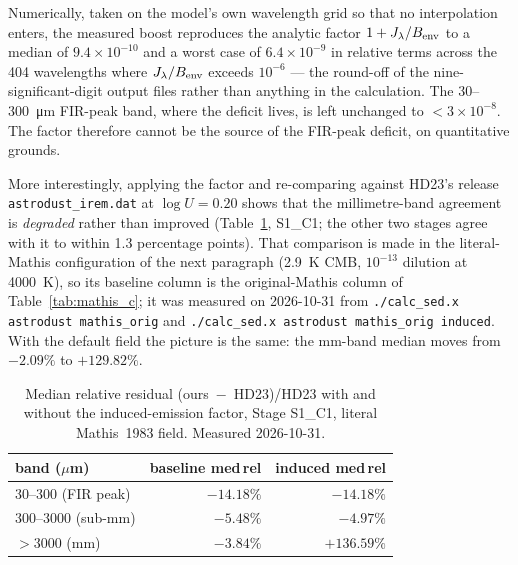 \documentclass{my_memo}
\begin{document}
Numerically, taken on the model's own wavelength grid so that no
interpolation enters, the measured boost reproduces the analytic factor
$1 + J_\lambda/B_{\rm env}$ to a median of $9.4\times10^{-10}$ and a
worst case of $6.4\times10^{-9}$ in relative terms across the 404
wavelengths where $J_\lambda/B_{\rm env}$ exceeds $10^{-6}$ --- the
round-off of the nine-significant-digit output files rather than
anything in the calculation. The \SI{30}{}--\SI{300}{\micro\meter}
FIR-peak band, where the deficit lives, is left unchanged to
$<3\times10^{-8}$. The factor therefore cannot be the source of the
FIR-peak deficit, on quantitative grounds.

More interestingly, applying the factor and re-comparing against
HD23's release \texttt{astrodust\_irem.dat} at $\log U = 0.20$
shows that the millimetre-band agreement is \emph{degraded} rather
than improved (Table~\ref{tab:induced_vs_hd23}, S1\_C1; the other two
stages agree with it to within 1.3 percentage points). That comparison
is made in the literal-Mathis configuration of the next paragraph
(\SI{2.9}{K} CMB, $10^{-13}$ dilution at \SI{4000}{K}), so its
baseline column is the original-Mathis column of
Table~\ref{tab:mathis_c}; it was measured on 2026-10-31 from
\texttt{./calc\_sed.x astrodust mathis\_orig} and
\texttt{./calc\_sed.x astrodust mathis\_orig induced}. With the default
field the picture is the same: the mm-band median moves from
$-2.09\%$ to $+129.82\%$.

\begin{table}[h]
\centering
\begin{tabular}{l r r}
\toprule
band ($\mu$m)              & baseline med\,rel & induced med\,rel \\
\midrule
30--300 (FIR peak)         & $-14.18\%$ & $-14.18\%$ \\
300--3000 (sub-mm)         & $-5.48\%$  & $-4.97\%$  \\
$>3000$ (mm)               & $-3.84\%$  & $+136.59\%$ \\
\bottomrule
\end{tabular}
\caption{Median relative residual (ours~$-$~HD23)/HD23 with and
without the induced-emission factor, Stage S1\_C1, literal Mathis~1983
field. Measured 2026-10-31.}
\label{tab:induced_vs_hd23}
\end{table}
\end{document}

